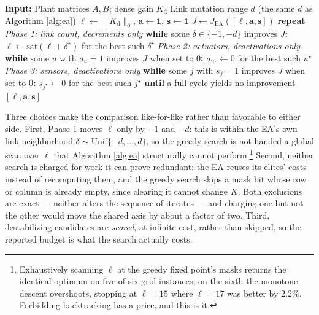 \begin{algorithm}%
\caption{Greedy pruning (monotone backward elimination)}
\label{alg:greedy}
\begin{algorithmic}[1]
\Statex \textbf{Input:}
\Statex \quad Plant matrices $A, B$; dense gain $K_\mathrm{d}$
\Statex \quad Link mutation range $d$ (the same $d$ as Algorithm \ref{alg:ea})
\State $\ell \gets \|K_\mathrm{d}\|_0$, \; $\mathbf{a} \gets \mathbf{1}$, \; $\mathbf{s} \gets \mathbf{1}$
\State $J \gets J_\mathrm{EA}([\ell,\mathbf{a},\mathbf{s}])$
\State \textbf{repeat}
\Statex \quad \textit{Phase 1: link count, decrements only}
\State \quad \textbf{while} some $\delta \in \{-1, -d\}$ improves $J$\textbf{:}
\State \quad \quad $\ell \gets \mathrm{sat}(\ell + \delta^\star)$ for the best such $\delta^\star$
\Statex \quad \textit{Phase 2: actuators, deactivations only}
\State \quad \textbf{while} some $u$ with $a_u = 1$ improves $J$ when set to $0$\textbf{:}
\State \quad \quad $a_{u^\star} \gets 0$ for the best such $u^\star$
\Statex \quad \textit{Phase 3: sensors, deactivations only}
\State \quad \textbf{while} some $j$ with $s_j = 1$ improves $J$ when set to $0$\textbf{:}
\State \quad \quad $s_{j^\star} \gets 0$ for the best such $j^\star$
\State \textbf{until} a full cycle yields no improvement
\State \Return $[\ell, \mathbf{a}, \mathbf{s}]$
\end{algorithmic}
\end{algorithm}

Three choices make the comparison like-for-like rather than favorable to either
side. First, Phase 1 moves $\ell$ only by $-1$ and $-d$: this is within the EA's
own link neighborhood $\delta \sim \mathrm{Unif}\{-d,\dots,d\}$, so the greedy
search is not handed a global scan over $\ell$ that Algorithm \ref{alg:ea}
structurally cannot perform.\footnote{Exhaustively scanning $\ell$ at the greedy
fixed point's masks returns the identical optimum on five of six grid instances;
on the sixth the monotone descent overshoots, stopping at $\ell = 15$ where
$\ell = 17$ was better by $2.2\%$. Forbidding backtracking has a price, and this
is it.} Second, neither search is charged for work it can prove redundant: the
EA reuses its elites' costs instead of recomputing them, and the greedy search
skips a mask bit whose row or column is already empty, since clearing it cannot
change $K$. Both exclusions are exact --- neither alters the sequence of
iterates --- and charging one but not the other would move the shared axis by
about a factor of two. Third, destabilizing candidates are \emph{scored}, at
infinite cost, rather than skipped, so the reported budget is what the search
actually costs.

